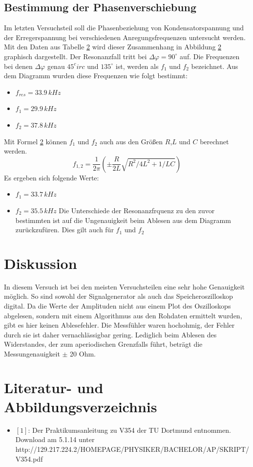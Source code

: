 \documentclass[11pt,ngerman,a4paper]{article}
\begin{document}
\subsection{Bestimmung der Phasenverschiebung}
Im letzten Versuchsteil soll die Phasenbeziehung von Kondensatorspannung und der Erregerspannung bei verschiedenen Anregungsfrequenzen untersucht werden. Mit den Daten aus Tabelle \ref{} wird dieser Zusammenhang in Abbildung \ref{} graphisch dargestellt. Der Resonanzfall tritt bei $\Delta \varphi = 90^\circ$ auf. Die Frequenzen bei denen $\Delta \varphi$ genau $45^circ$ und $135^\circ$ ist, werden als $f_1$ und $f_2$ bezeichnet. Aus dem Diagramm wurden diese Frequenzen wie folgt bestimmt:
\begin{itemize}
\item $f_{res} = 33.9\,kHz$
\item $f_{1} = 29.9\,kHz$
\item $f_{2} = 37.8\,kHz$
\end{itemize}
Mit Formel \ref{} k\"onnen $f_1$ und $f_2$ auch aus den Gr\"o\ss en $R$,$L$ und $C$ berechnet werden.
\[
f_{1,2} = \frac{1}{2 \pi} (\pm \frac{R}{2L} \sqrt{R^2/4L^2 + 1/LC}
  )
\]
Es ergeben sich folgende Werte:
\begin{itemize}
\item $f_1 = 33.7\,kHz$
\item $f_2 = 35.5\,kHz$
Die Unterschiede der Resonanzfrquenz zu den zuvor bestimmten ist auf die Ungenauigkeit beim Ablesen aus dem Diagramm zur\"uckzuf\"uren. Dies gilt auch f\"ur $f_1$ und $f_2$
\end{itemize}
\section{Diskussion}
In diesem Versuch ist bei den meisten Versuchsteilen eine sehr hohe Genauigkeit möglich. So sind sowohl der Signalgenerator als auch das Speicheroszilloskop digital. Da die Werte der Amplituden nicht aus einem Plot des Oszilloskops abgelesen, sondern mit einem Algorithmus aus den Rohdaten ermittelt wurden, gibt es hier keinen Ablesefehler. Die Messfühler waren hochohmig, der Fehler durch sie ist daher vernachlässigbar gering. Lediglich beim Ablesen des Widerstandes, der zum aperiodischen Grenzfalls führt, beträgt die Messungenauigkeit $\pm$ 20 Ohm.
\section{Literatur- und Abbildungsverzeichnis}
\begin{itemize}
\item $[1]$: Der Praktikumsanleitung zu V354 der TU Dortmund entnommen. Download am 5.1.14 unter \newline http://129.217.224.2/HOMEPAGE/PHYSIKER/BACHELOR/AP/SKRIPT/V354.pdf
\end{itemize}
\end{document}
